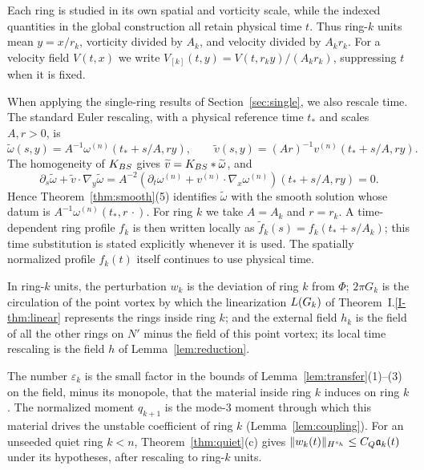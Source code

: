 Each ring is studied in its own spatial and vorticity scale, while the
indexed quantities in the global construction all retain physical time $t$.
Thus ring-$k$ units mean $y=x/r_k$, vorticity divided by $A_k$, and velocity
divided by $A_kr_k$. For a velocity field $V(t,x)$ we write
$V_{[k]}(t,y)=V(t,r_ky)/(A_kr_k)$, suppressing $t$ when it is fixed.

When applying the single-ring results of Section~\ref{sec:single}, we also
rescale time. The standard Euler rescaling, with a physical reference time
$t_*$ and scales $A,r>0$, is
\[
\widetilde\omega(s,y)=A^{-1}\omega^{(n)}(t_*+s/A,ry),\qquad
\widetilde v(s,y)=(Ar)^{-1}v^{(n)}(t_*+s/A,ry).
\]
The homogeneity of $K_{BS}$ gives $\widetilde v=K_{BS}\ast\widetilde\omega$, and
\[
\partial_s\widetilde\omega+\widetilde v\cdot\nabla_y\widetilde\omega
=A^{-2}(\partial_t\omega^{(n)}+v^{(n)}\cdot\nabla_x\omega^{(n)})(t_*+s/A,ry)=0.
\]
Hence Theorem~\ref{thm:smooth}\textup{(5)} identifies $\widetilde\omega$ with
the smooth solution whose datum is $A^{-1}\omega^{(n)}(t_*,r\,\cdot)$.
For ring $k$ we take $A=A_k$ and $r=r_k$. A time-dependent ring profile $f_k$
is then written locally as $\widetilde f_k(s)=f_k(t_*+s/A_k)$; this time
substitution is stated explicitly whenever it is used. The spatially
normalized profile $f_k(t)$ itself continues to use physical time.

In ring-$k$ units, the perturbation $w_k$ is the
deviation of ring $k$ from $\Phi$; $2\pi G_k$ is the circulation of the point
vortex by which the linearization $L(G_k)$ of Theorem~I.\ref{I-thm:linear}
represents the rings inside ring $k$; and the external field $h_k$ is the field
of all the other rings on $N'$ minus the field of this point vortex;
its local time rescaling is the field $h$ of Lemma~\ref{lem:reduction}.

The number $\varepsilon_k$ is the small factor in the bounds of
Lemma~\ref{lem:transfer}\textup{(1)}--\textup{(3)} on the field, minus its
monopole, that the material inside ring $k$ induces on ring $k$. The
normalized moment $q_{k+1}$ is the mode-$3$ moment through which this material
drives the unstable coefficient of ring $k$ (Lemma~\ref{lem:coupling}).
For an unseeded quiet ring $k<n$, Theorem~\ref{thm:quiet}\textup{(c)} gives
$\|w_k(t)\|_{H^{s_h}}\le C_Q\mathfrak{a}_k(t)$ under its hypotheses, after rescaling
to ring-$k$ units.

